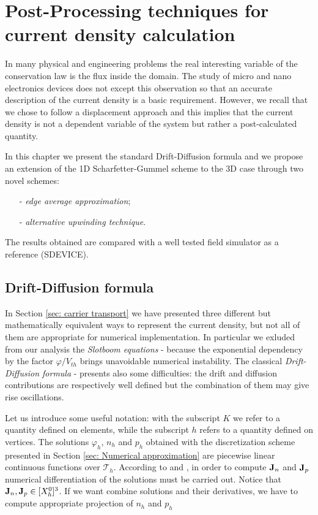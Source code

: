 \chapter{Post-Processing techniques for current density calculation}
\label{chap: postprocess}

In many physical and engineering problems the real interesting variable of the conservation law is the flux inside the domain. The study of micro and nano electronics devices does not except this observation so that an accurate description of the current density is a basic requirement.
However, we recall that we chose to follow a displacement approach and this implies that the current density is not a dependent variable of the system but rather a post-calculated quantity.

In this chapter we present the standard Drift-Diffusion formula and we propose an extension of the 1D Scharfetter-Gummel scheme \cite{Gummel:SignAnalys} to the 3D case through two novel schemes:
\begin{itemize}
\item[-] \textit{edge average approximation};
\item[-] \textit{alternative upwinding technique}.   
\end{itemize}

The results obtained are compared with a well tested field simulator as a reference (SDEVICE).

\section{Drift-Diffusion formula}

In Section \ref{sec: carrier transport} we have presented three different but mathematically equivalent ways to represent the current density, but not all of them are appropriate for numerical implementation. In particular we exluded from our analysis the \textit{Slotboom equations} - because  the exponential dependency by the factor $\varphi / V_{th}$ brings unavoidable numerical instability. 
The classical \textit{Drift-Diffusion formula} - presents also some difficulties: the drift and diffusion contributions are respectively well defined but the combination of them may give rise oscillations.

Let us introduce some useful notation: with the subscript $K$  we refer to a quantity defined on elements, while the subscript $h$ refers to a quantity defined on vertices. The solutions $\varphi_h$, $n_h$ and $p_h$ obtained with the discretization scheme presented in Section \ref{sec: Numerical approximation} are piecewise linear continuous functions over $\mathcal{T}_h$. According to   and ,  in order to compute $\mathbf{J}_n$ and $\mathbf{J}_p$ numerical differentiation of the solutions must be carried out. Notice that $\mathbf{J}_{n},\mathbf{J}_{p} \in [X_h^0]^3$. If we want combine solutions and their derivatives, we have to compute appropriate projection of $n_h$ and $p_h$
 
